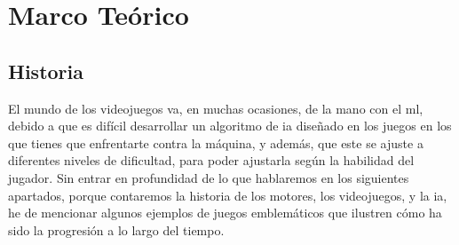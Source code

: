 
\chapter{Marco Teórico}
\label{marcoteorico}

\section{Historia}
El mundo de los videojuegos va, en muchas ocasiones, de la mano con el \gls{ml}, debido a que es difícil desarrollar un algoritmo de \gls{ia} diseñado en los juegos en los que tienes que enfrentarte contra la máquina, y además, que este se ajuste a diferentes niveles de dificultad, para poder ajustarla según la habilidad del jugador. Sin entrar en profundidad de lo que hablaremos en los siguientes apartados, porque contaremos la historia de los motores, los videojuegos, y la \gls{ia}, he de mencionar algunos ejemplos de juegos emblemáticos que ilustren cómo ha sido la progresión a lo largo del tiempo. 
